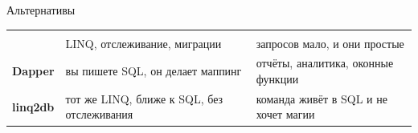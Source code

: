 \documentclass[aspectratio=169,10pt,t]{beamer}
\begin{document}
\begin{frame}{Альтернативы}
  \slidetop
  {\renewcommand{\arraystretch}{1.5}
  \begin{tabular}{@{}L{3.0cm}L{4.9cm}L{4.9cm}@{}}
    &  &  \\
     & LINQ, отслеживание, миграции      & запросов мало, и они
      простые \\
    \textbf{Dapper}       & вы пишете SQL, он делает маппинг  & отчёты, аналитика,
      оконные функции \\
    \textbf{linq2db}      & тот же LINQ, ближе к SQL, без отслеживания & команда живёт
      в SQL и не хочет магии \\
  \end{tabular}}

  \slidegap
\end{frame}

\begin{frame}[plain]
\end{frame}
\end{document}
